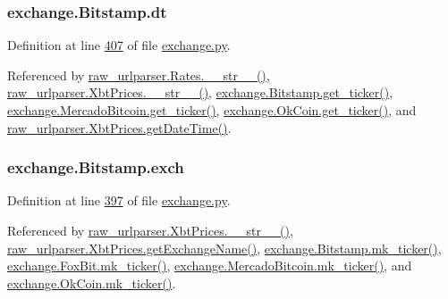 \subsubsection[{\texorpdfstring{dt}{dt}}]{\setlength{\rightskip}{0pt plus 5cm}exchange.\+Bitstamp.\+dt}\hypertarget{classexchange_1_1_bitstamp_a527b7d7c5814118b5adfdaf0b960f036}{}\label{classexchange_1_1_bitstamp_a527b7d7c5814118b5adfdaf0b960f036}


Definition at line \hyperlink{exchange_8py_source_l00407}{407} of file \hyperlink{exchange_8py_source}{exchange.\+py}.



Referenced by \hyperlink{raw__urlparser_8py_source_l00038}{raw\+\_\+urlparser.\+Rates.\+\_\+\+\_\+str\+\_\+\+\_\+()}, \hyperlink{raw__urlparser_8py_source_l00074}{raw\+\_\+urlparser.\+Xbt\+Prices.\+\_\+\+\_\+str\+\_\+\+\_\+()}, \hyperlink{exchange_8py_source_l00409}{exchange.\+Bitstamp.\+get\+\_\+ticker()}, \hyperlink{exchange_8py_source_l00543}{exchange.\+Mercado\+Bitcoin.\+get\+\_\+ticker()}, \hyperlink{exchange_8py_source_l00608}{exchange.\+Ok\+Coin.\+get\+\_\+ticker()}, and \hyperlink{raw__urlparser_8py_source_l00059}{raw\+\_\+urlparser.\+Xbt\+Prices.\+get\+Date\+Time()}.

\subsubsection[{\texorpdfstring{exch}{exch}}]{\setlength{\rightskip}{0pt plus 5cm}exchange.\+Bitstamp.\+exch}\hypertarget{classexchange_1_1_bitstamp_a140f44d1638f2e50ecb5148bf8f8ac86}{}\label{classexchange_1_1_bitstamp_a140f44d1638f2e50ecb5148bf8f8ac86}


Definition at line \hyperlink{exchange_8py_source_l00397}{397} of file \hyperlink{exchange_8py_source}{exchange.\+py}.



Referenced by \hyperlink{raw__urlparser_8py_source_l00074}{raw\+\_\+urlparser.\+Xbt\+Prices.\+\_\+\+\_\+str\+\_\+\+\_\+()}, \hyperlink{raw__urlparser_8py_source_l00068}{raw\+\_\+urlparser.\+Xbt\+Prices.\+get\+Exchange\+Name()}, \hyperlink{exchange_8py_source_l00423}{exchange.\+Bitstamp.\+mk\+\_\+ticker()}, \hyperlink{exchange_8py_source_l00482}{exchange.\+Fox\+Bit.\+mk\+\_\+ticker()}, \hyperlink{exchange_8py_source_l00557}{exchange.\+Mercado\+Bitcoin.\+mk\+\_\+ticker()}, and \hyperlink{exchange_8py_source_l00622}{exchange.\+Ok\+Coin.\+mk\+\_\+ticker()}.

